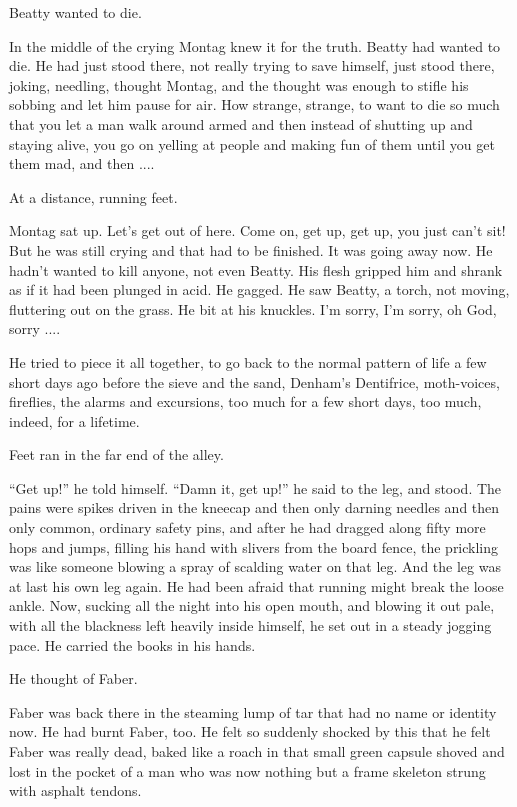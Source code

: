 \documentclass[11pt,openany]{book}
\begin{document}
Beatty wanted to die.

In the middle of the crying Montag knew it for the truth. Beatty had wanted to die. He had just stood there, not really trying to save himself, just stood there, joking, needling, thought Montag, and the thought was enough to stifle his sobbing and let him pause for air. How strange, strange, to want to die so much that you let a man walk around armed and then instead of shutting up and staying alive, you go on yelling at people and making fun of them until you get them mad, and then ....

At a distance, running feet.

Montag sat up. Let's get out of here. Come on, get up, get up, you just can't sit! But he was still crying and that had to be finished. It was going away now. He hadn't wanted to kill anyone, not even Beatty. His flesh gripped him and shrank as if it had been plunged in acid. He gagged. He saw Beatty, a torch, not moving, fluttering out on the grass. He bit at his knuckles. I'm sorry, I'm sorry, oh God, sorry ....

He tried to piece it all together, to go back to the normal pattern of life a few short days ago before the sieve and the sand, Denham's Dentifrice, moth-voices, fireflies, the alarms and excursions, too much for a few short days, too much, indeed, for a lifetime.

Feet ran in the far end of the alley.

``Get up!'' he told himself. ``Damn it, get up!'' he said to the leg, and stood. The pains were spikes driven in the kneecap and then only darning needles and then only common, ordinary safety pins, and after he had dragged along fifty more hops and jumps, filling his hand with slivers from the board fence, the prickling was like someone blowing a spray of scalding water on that leg. And the leg was at last his own leg again. He had been afraid that running might break the loose ankle. Now, sucking all the night into his open mouth, and blowing it out pale, with all the blackness left heavily inside himself, he set out in a steady jogging pace. He carried the books in his hands.

He thought of Faber.

Faber was back there in the steaming lump of tar that had no name or identity now. He had burnt Faber, too. He felt so suddenly shocked by this that he felt Faber was really dead, baked like a roach in that small green capsule shoved and lost in the pocket of a man who was now nothing but a frame skeleton strung with asphalt tendons.
\end{document}
